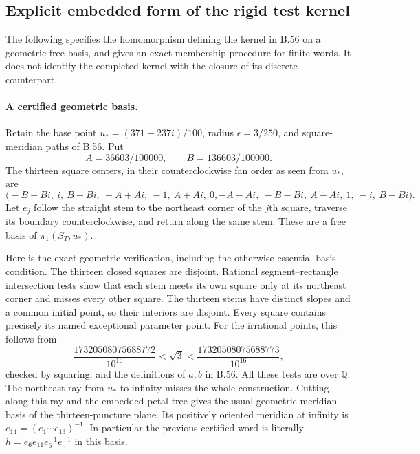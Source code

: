 \subsection*{Explicit embedded form of the rigid test kernel}

The following specifies the homomorphism defining the kernel in B.56
on a geometric free basis, and gives an exact membership procedure
for finite words.  It does not identify the completed kernel with
the closure of its discrete counterpart.

\paragraph{A certified geometric basis.}
Retain the base point $u_*=(371+237i)/100$, radius
$\epsilon=3/250$, and square-meridian paths of B.56.
Put
\[
 A=36603/100000,\qquad B=136603/100000.
\]
The thirteen square centers, in their counterclockwise fan order
as seen from $u_*$, are
\[
 \bigl(-B+Bi,\ i,\ B+Bi,\ -A+Ai,\ -1,\ A+Ai,\ 0,
       -A-Ai,\ -B-Bi,\ A-Ai,\ 1,\ -i,\ B-Bi\bigr).
 \tag{B.56.5}
\]
Let $e_j$ follow the straight stem to the northeast corner of
the $j$th square, traverse its boundary counterclockwise, and
return along the same stem.  These are a free basis of
$\pi_1(S_T,u_*)$.

Here is the exact geometric verification, including the
otherwise essential basis condition.  The thirteen closed
squares are disjoint.  Rational segment--rectangle intersection
tests show that each stem meets its own square only at its
northeast corner and misses every other square.  The thirteen
stems have distinct slopes and a common initial point, so their
interiors are disjoint.  Every square contains precisely its
named exceptional parameter point.  For the irrational points,
this follows from
\[
 \frac{17320508075688772}{10^{16}}<\sqrt3<
 \frac{17320508075688773}{10^{16}},
\]
checked by squaring, and the definitions of $a,b$ in B.56.
All these tests are over $\mathbb Q$.  The northeast ray from
$u_*$ to infinity misses the whole construction.  Cutting along
this ray and the embedded petal tree gives the usual geometric
meridian basis of the thirteen-puncture plane.  Its positively
oriented meridian at infinity is
$e_{14}=(e_1\cdots e_{13})^{-1}$.
In particular the previous certified word is literally
$h=e_6e_{11}e_6^{-1}e_5^{-1}$ in this basis.

